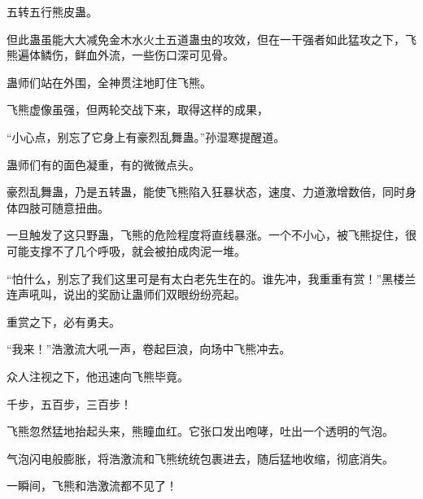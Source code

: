 \begin{this_body}
五转五行熊皮蛊。

但此蛊虽能大大减免金木水火土五道蛊虫的攻效，但在一干强者如此猛攻之下，飞熊遍体鳞伤，鲜血外流，一些伤口深可见骨。

蛊师们站在外围，全神贯注地盯住飞熊。

飞熊虚像虽强，但两轮交战下来，取得这样的成果，

“小心点，别忘了它身上有豪烈乱舞蛊。”孙湿寒提醒道。

蛊师们有的面色凝重，有的微微点头。

豪烈乱舞蛊，乃是五转蛊，能使飞熊陷入狂暴状态，速度、力道激增数倍，同时身体四肢可随意扭曲。

一旦触发了这只野蛊，飞熊的危险程度将直线暴涨。一个不小心，被飞熊捉住，很可能支撑不了几个呼吸，就会被拍成肉泥一堆。

“怕什么，别忘了我们这里可是有太白老先生在的。谁先冲，我重重有赏！”黑楼兰连声吼叫，说出的奖励让蛊师们双眼纷纷亮起。

重赏之下，必有勇夫。

“我来！”浩激流大吼一声，卷起巨浪，向场中飞熊冲去。

众人注视之下，他迅速向飞熊毕竟。

千步，五百步，三百步！

飞熊忽然猛地抬起头来，熊瞳血红。它张口发出咆哮，吐出一个透明的气泡。

气泡闪电般膨胀，将浩激流和飞熊统统包裹进去，随后猛地收缩，彻底消失。

一瞬间，飞熊和浩激流都不见了！

\end{this_body}


